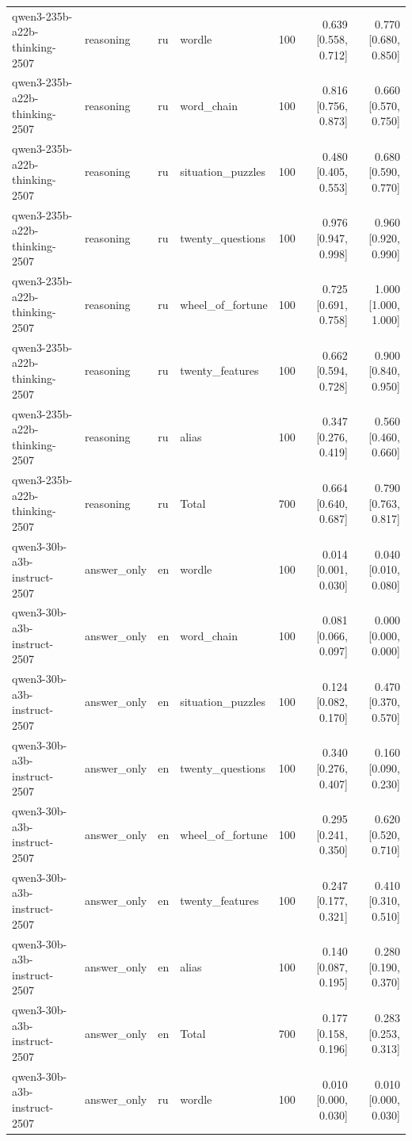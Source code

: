 \begin{longtable}{llllrrr}
qwen3-235b-a22b-thinking-2507 & reasoning & ru & wordle & 100 & 0.639 [0.558, 0.712] & 0.770 [0.680, 0.850] \\
qwen3-235b-a22b-thinking-2507 & reasoning & ru & word\_chain & 100 & 0.816 [0.756, 0.873] & 0.660 [0.570, 0.750] \\
qwen3-235b-a22b-thinking-2507 & reasoning & ru & situation\_puzzles & 100 & 0.480 [0.405, 0.553] & 0.680 [0.590, 0.770] \\
qwen3-235b-a22b-thinking-2507 & reasoning & ru & twenty\_questions & 100 & 0.976 [0.947, 0.998] & 0.960 [0.920, 0.990] \\
qwen3-235b-a22b-thinking-2507 & reasoning & ru & wheel\_of\_fortune & 100 & 0.725 [0.691, 0.758] & 1.000 [1.000, 1.000] \\
qwen3-235b-a22b-thinking-2507 & reasoning & ru & twenty\_features & 100 & 0.662 [0.594, 0.728] & 0.900 [0.840, 0.950] \\
qwen3-235b-a22b-thinking-2507 & reasoning & ru & alias & 100 & 0.347 [0.276, 0.419] & 0.560 [0.460, 0.660] \\
qwen3-235b-a22b-thinking-2507 & reasoning & ru & Total & 700 & 0.664 [0.640, 0.687] & 0.790 [0.763, 0.817] \\
qwen3-30b-a3b-instruct-2507 & answer\_only & en & wordle & 100 & 0.014 [0.001, 0.030] & 0.040 [0.010, 0.080] \\
qwen3-30b-a3b-instruct-2507 & answer\_only & en & word\_chain & 100 & 0.081 [0.066, 0.097] & 0.000 [0.000, 0.000] \\
qwen3-30b-a3b-instruct-2507 & answer\_only & en & situation\_puzzles & 100 & 0.124 [0.082, 0.170] & 0.470 [0.370, 0.570] \\
qwen3-30b-a3b-instruct-2507 & answer\_only & en & twenty\_questions & 100 & 0.340 [0.276, 0.407] & 0.160 [0.090, 0.230] \\
qwen3-30b-a3b-instruct-2507 & answer\_only & en & wheel\_of\_fortune & 100 & 0.295 [0.241, 0.350] & 0.620 [0.520, 0.710] \\
qwen3-30b-a3b-instruct-2507 & answer\_only & en & twenty\_features & 100 & 0.247 [0.177, 0.321] & 0.410 [0.310, 0.510] \\
qwen3-30b-a3b-instruct-2507 & answer\_only & en & alias & 100 & 0.140 [0.087, 0.195] & 0.280 [0.190, 0.370] \\
qwen3-30b-a3b-instruct-2507 & answer\_only & en & Total & 700 & 0.177 [0.158, 0.196] & 0.283 [0.253, 0.313] \\
qwen3-30b-a3b-instruct-2507 & answer\_only & ru & wordle & 100 & 0.010 [0.000, 0.030] & 0.010 [0.000, 0.030] \\

\end{longtable}
